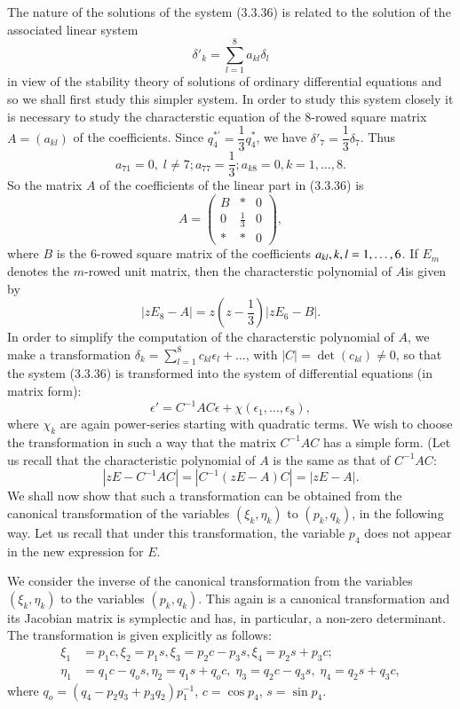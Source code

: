 The nature of the solutions of the system (3.3.36) is related to the
solution of the associated linear system 
$$
\delta'_k = \sum\limits^8_{l=1} a_{kl} \delta_l
$$
in view of the stability theory of solutions of ordinary differential
equations and so we shall first study this simpler system. In order to
study this system closely it is necessary to study the characterstic
equation of the 8-rowed square matrix $A = (a_{kl})$ of the
coefficients. Since $q^{*'}_4 = \dfrac{1}{3} q^*_4$, we have
$\delta'_7 = \dfrac{1}{3} \delta_7$. Thus 
$$
a_{71} = 0, \; l \neq 7; a_{77} = \frac{1}{3}; a_{k8} = 0, k =1, \ldots, 8.
$$
So the matrix $A$ of the coefficients of the linear part in (3.3.36)
is  
$$
A = \begin{pmatrix}
B & * & 0\\
0 & \frac{1}{3} & 0\\
* & * & 0
\end{pmatrix},
$$
where $B$ is the 6-rowed square matrix of the coefficients $a_{kl}, k,
l = 1,\break \ldots, 6$. If $E_m$ denotes the $m$-rowed unit matrix,
then the characterstic polynomial of $A$\pageoriginale is given by 
\begin{equation*}
|z E_8 - A| = z(z -\dfrac{1}{3}) |z E_6 - B|. \tag{3.4.37}\label{chap3:eq3.4.37}
\end{equation*}
In order to simplify the computation of the characterstic polynomial
of $A$, we make a transformation $\delta_k = \sum\limits^8_{l=1}
c_{kl} \epsilon_l + \ldots$, with $|C| = \det (c_{kl}) \neq 0$, so
that the system (3.3.36) is transformed into the system of
differential equations (in matrix form): 
$$
\epsilon' = C^{-1} A C \epsilon +\chi (\epsilon_1, \ldots, \epsilon_8),
$$
where $\chi_k$ are again power-series starting with quadratic
terms. We wish to choose the transformation in such a way that the
matrix $C^{-1} AC$ has a simple form. (Let us recall that the
characteristic polynomial of $A$ is the same as that of $C^{-1} AC$: 
$$
|zE - C^{-1} AC| = |C^{-1} (zE -A) C| = |zE - A|. 
$$
We shall now show that such a transformation can be obtained from the
canonical transformation of the variables $(\xi_k, \eta_k)$ to $(p_k,
q_k)$, in the following way. Let us recall that under this
transformation, the variable $p_4$ does not appear in the new
expression for $E$. 

We consider the inverse of the canonical transformation from the
variables $(\xi_k, \eta_k)$ to the variables $(p_k, q_k)$. This again
is a canonical transformation and its Jacobian  matrix is symplectic
and has, in particular, a non-zero determinant. The transformation is
given explicitly as follows: 
\begin{align*}
\xi_1 & = p_1 c, \xi_2 = p_1 s, \xi_3 = p_2 c - p_3 s, \xi_4 = p_2 s +
p_3 c;\\ 
\eta_1 & = q_1 c-q_o s, \eta_2 = q_1 s + q_o c, \; \eta_3 = q_2 c -q_3
s, \; \eta_4 = q_2 s + q_3 c, \tag{3.4.38}\label{chap3:eq3.4.38} 
\end{align*}\pageoriginale
where $q_o = (q_4 - p_2 q_3 + p_3 q_2) p^{-1}_1$, $c = \cos p_4$, $s =
\sin p_4$.  

